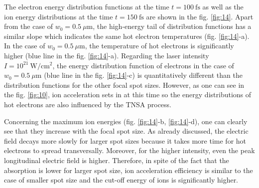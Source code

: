 The electron energy distribution functions at the time $ t = 100 \ \mathrm{fs} $ as well as the ion energy distributions at the time $ t = 150 \ \mathrm{fs} $ are shown in the fig. \ref{fig:14}. Apart from the case of $ w_0 = 0.5 \ \mu\mathrm{m} $, the high-energy tail of distribution functions has a similar slope which indicates the same hot electron temperatures (fig. \ref{fig:14}-a). In the case of $ w_0 = 0.5 \ \mu\mathrm{m} $, the temperature of hot electrons is significantly higher (blue line in the fig. \ref{fig:14}-a). Regarding the laser intensity $ I = 10^{21} \ \mathrm{W/cm^2} $, the energy distribution function of electrons in the case of $ w_0 = 0.5 \ \mu\mathrm{m} $ (blue line in the fig. \ref{fig:14}-c) is quantitatively different than the distribution functions for the other focal spot sizes. However, as one can see in the fig. \ref{fig:10}, ion acceleration sets in at this time so the energy distributions of hot electrons are also influenced by the TNSA process.

Concerning the maximum ion energies (fig. \ref{fig:14}-b, \ref{fig:14}-d), one can clearly see that they increase with the focal spot size. As already discussed, the electric field decays more slowly for larger spot sizes because it takes more time for hot electrons to spread transversally. Moreover, for the higher intensity, even the peak longitudinal electric field is higher. Therefore, in spite of the fact that the absorption is lower for larger spot size, ion acceleration efficiency is similar to the case of smaller spot size and the cut-off energy of ions is significantly higher.